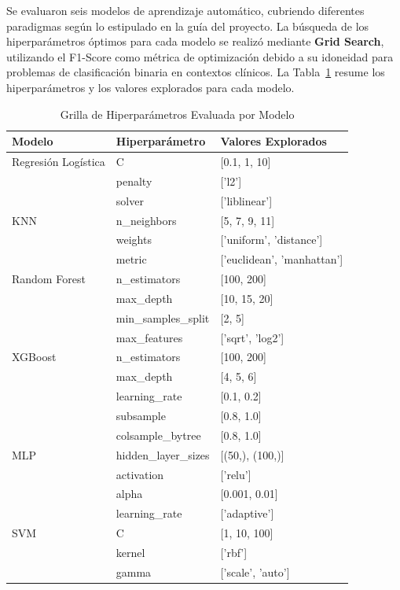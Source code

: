 \documentclass[journal]{IEEEtai}
\begin{document}
Se evaluaron seis modelos de aprendizaje automático, cubriendo diferentes paradigmas según lo estipulado en la guía del proyecto. La búsqueda de los hiperparámetros óptimos para cada modelo se realizó mediante \textbf{Grid Search}, utilizando el F1-Score como métrica de optimización debido a su idoneidad para problemas de clasificación binaria en contextos clínicos. La Tabla~\ref{tab:hyperparams} resume los hiperparámetros y los valores explorados para cada modelo.

\begin{table}[!ht]
\centering
\caption{Grilla de Hiperparámetros Evaluada por Modelo}
\label{tab:hyperparams}
\begin{tabular}{lll}
\toprule
\textbf{Modelo} & \textbf{Hiperparámetro} & \textbf{Valores Explorados} \\
\midrule
Regresión Logística & C & [0.1, 1, 10] \\
 & penalty & ['l2'] \\
 & solver & ['liblinear'] \\
\addlinespace
KNN & n\_neighbors & [5, 7, 9, 11] \\
 & weights & ['uniform', 'distance'] \\
 & metric & ['euclidean', 'manhattan'] \\
\addlinespace
Random Forest & n\_estimators & [100, 200] \\
 & max\_depth & [10, 15, 20] \\
 & min\_samples\_split & [2, 5] \\
 & max\_features & ['sqrt', 'log2'] \\
\addlinespace
XGBoost & n\_estimators & [100, 200] \\
 & max\_depth & [4, 5, 6] \\
 & learning\_rate & [0.1, 0.2] \\
 & subsample & [0.8, 1.0] \\
 & colsample\_bytree & [0.8, 1.0] \\
\addlinespace
MLP & hidden\_layer\_sizes & [(50,), (100,)] \\
 & activation & ['relu'] \\
 & alpha & [0.001, 0.01] \\
 & learning\_rate & ['adaptive'] \\
\addlinespace
SVM & C & [1, 10, 100] \\
 & kernel & ['rbf'] \\
 & gamma & ['scale', 'auto'] \\
\bottomrule
\end{tabular}
\end{table}
\end{document}
